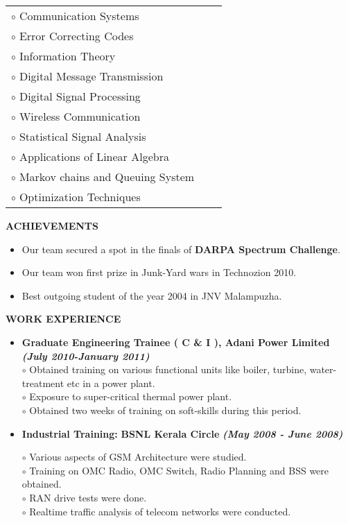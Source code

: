 \documentclass[a4paper,10pt]{article}
\begin{document}
 \begin{tabular}{p{3.5in}p{5in}p{3.5in}}
     $\circ$ Communication Systems \\
     $\circ$ Error Correcting Codes \\
    $\circ$ Information Theory \\
    $\circ$ Digital Message Transmission \\
    $\circ$ Digital Signal Processing \\
    $\circ$ Wireless Communication \\
    $\circ$ Statistical Signal Analysis \\
    $\circ$ Applications of Linear Algebra \\
    $\circ$ Markov chains and Queuing System \\
    $\circ$ Optimization Techniques \\
\end{tabular}

 \colorbox{titleColor}{\parbox{6.5in}{\textbf{ACHIEVEMENTS}}}

 \begin{itemize}
  \item Our team secured a spot in the finals of \textbf{DARPA Spectrum Challenge}.
  \item Our team won first prize in Junk-Yard wars in Technozion 2010.
  \item Best outgoing student of the year 2004 in JNV Malampuzha.
  \end{itemize}

 \colorbox{titleColor}{\parbox{6.5in}{\textbf{WORK EXPERIENCE}}}

 \begin{itemize}
 \setlength{\itemsep}{1pt}
 \item \textbf{Graduate Engineering Trainee ( C \& I ), Adani Power Limited}  \textbf \emph{(July 2010-January 2011)}\\ 
 $\circ$ Obtained training on various functional units like boiler, turbine, water-treatment etc in a power plant.\\
 $\circ$ Exposure to super-critical thermal power plant. \\
 $\circ$ Obtained two weeks of training on soft-skills during this period.
 
   \item \textbf{Industrial Training:} \textbf{BSNL Kerala Circle}  \textbf \emph{(May 2008 - June 2008)}        

  $\circ$ Various aspects of GSM Architecture were studied. \\
  $\circ$ Training on OMC Radio, OMC Switch, Radio Planning and BSS were obtained. \\
  $\circ$ RAN drive tests were done. \\
  $\circ$ Realtime traffic analysis of telecom networks were conducted.

\end{itemize}
\end{document}
